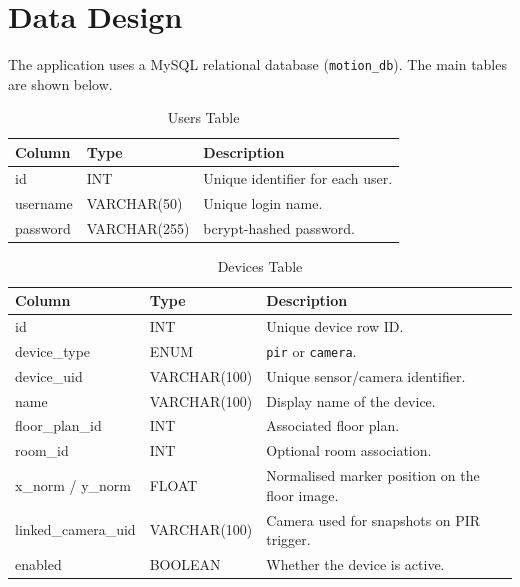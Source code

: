 \documentclass[12pt,a4paper]{report}
\begin{document}
\section{Data Design}

The application uses a MySQL relational database (\texttt{motion\_db}). The main tables are shown below.

\begin{table}[htbp]
\centering
\begin{tabular}{|p{5cm}|p{3cm}|p{6cm}|}
\hline
\textbf{Column} & \textbf{Type} & \textbf{Description} \\ \hline
id & INT & Unique identifier for each user. \\ \hline
username & VARCHAR(50) & Unique login name. \\ \hline
password & VARCHAR(255) & bcrypt-hashed password. \\ \hline
\end{tabular}
\caption{Users Table}
\end{table}

\begin{table}[htbp]
\centering
\begin{tabular}{|p{5cm}|p{3cm}|p{6cm}|}
\hline
\textbf{Column} & \textbf{Type} & \textbf{Description} \\ \hline
id & INT & Unique device row ID. \\ \hline
device\_type & ENUM & \texttt{pir} or \texttt{camera}. \\ \hline
device\_uid & VARCHAR(100) & Unique sensor/camera identifier. \\ \hline
name & VARCHAR(100) & Display name of the device. \\ \hline
floor\_plan\_id & INT & Associated floor plan. \\ \hline
room\_id & INT & Optional room association. \\ \hline
x\_norm / y\_norm & FLOAT & Normalised marker position on the floor image. \\ \hline
linked\_camera\_uid & VARCHAR(100) & Camera used for snapshots on PIR trigger. \\ \hline
enabled & BOOLEAN & Whether the device is active. \\ \hline
\end{tabular}
\caption{Devices Table}
\end{table}
\end{document}
